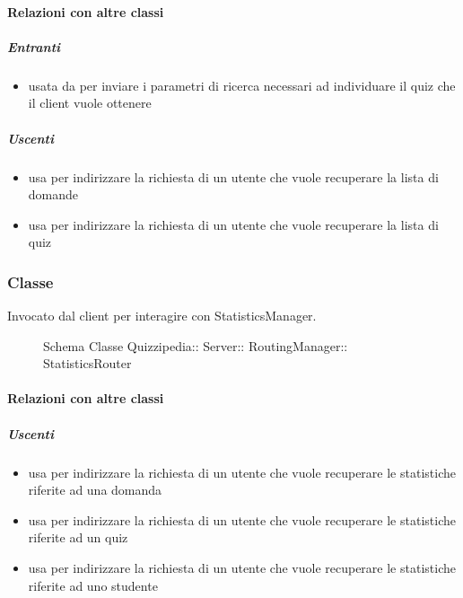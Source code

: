 \paragraph{Relazioni con altre classi}
\subparagraph{Entranti}
\begin{itemize}
\item usata da  per inviare i parametri di ricerca necessari ad individuare il quiz che il client vuole ottenere
\end{itemize}
\subparagraph{Uscenti}
\begin{itemize}
\item usa  per indirizzare la richiesta di un utente che vuole recuperare la lista di domande
\item usa  per indirizzare la richiesta di un utente che vuole recuperare la lista di quiz
\end{itemize}
\subsubsection{Classe }
Invocato dal client per interagire con StatisticsManager.
\begin{figure}[H]
\centering
\noindent{}
\caption[Schema Classe StatisticsRouter]{Schema Classe Quizzipedia:: Server:: RoutingManager:: StatisticsRouter}
\end{figure}
\paragraph{Relazioni con altre classi}
\subparagraph{Uscenti}
\begin{itemize}
\item usa  per indirizzare la richiesta di un utente che vuole recuperare le statistiche riferite ad una domanda
\item usa  per indirizzare la richiesta di un utente che vuole recuperare le statistiche riferite ad un quiz
\item usa  per indirizzare la richiesta di un utente che vuole recuperare le statistiche riferite ad uno studente
\end{itemize}
